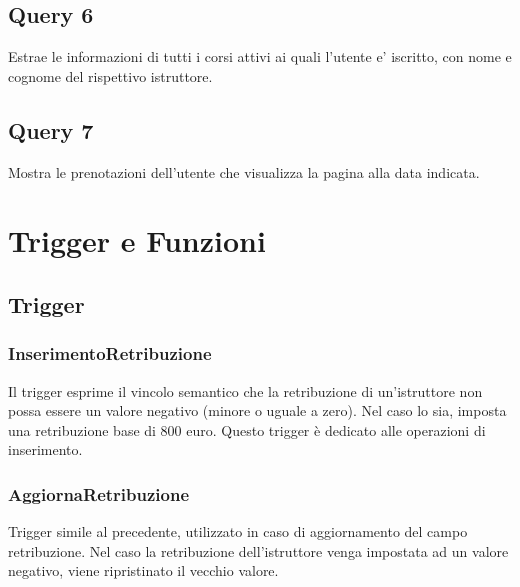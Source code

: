 

\section{Query 6}

Estrae le informazioni di tutti i corsi attivi ai quali l'utente e' iscritto, con nome e cognome del rispettivo istruttore.\\



\section{Query 7}

Mostra le prenotazioni dell'utente che visualizza la pagina alla data indicata.\\



\chapter{Trigger e Funzioni} 

\section{Trigger}

\subsection{InserimentoRetribuzione}


Il trigger esprime il vincolo semantico che la retribuzione di un'istruttore non possa essere un valore negativo (minore o uguale a zero). Nel caso lo sia, imposta una retribuzione base di 800 euro.
Questo trigger è dedicato alle operazioni di inserimento.

\subsection{AggiornaRetribuzione}


Trigger simile al precedente, utilizzato in caso di aggiornamento del campo retribuzione. Nel caso la retribuzione dell'istruttore venga impostata ad un valore negativo, viene ripristinato il vecchio valore.

